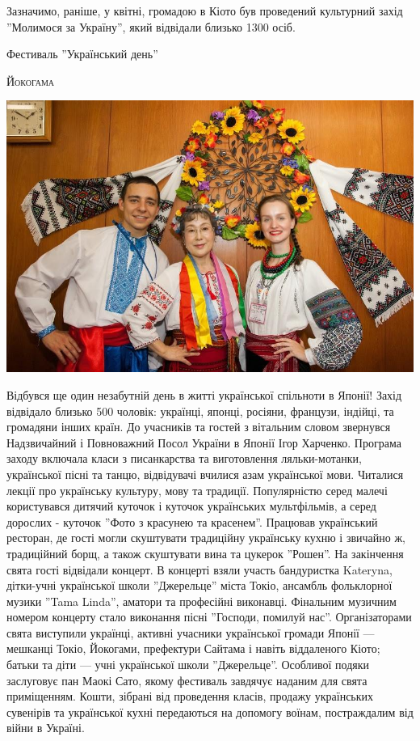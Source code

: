 \documentclass[10pt,a4paper]{article}
\newcommand{\NewsItem}[1]{%
		\usefont{T2A}{iwona}{m}{n} 
		\large #1 \vspace{4pt}
		\par \normalsize \normalfont}
\newcommand{\NewsAuthor}[1]{%
			\hfill \textsc{#1} \vspace{4pt}
			\par \normalfont}
\begin{document}
\begin{multicols}{3}
Зазначимо, раніше, у квітні, громадою в Кіото був проведений культурний захід ''Молимося за Україну'', який відвідали близько 1300 осіб.

\vspace{1cm}
\NewsItem{Фестиваль ''Український день''}
\NewsAuthor{Йокогама}
		\begin{center}
			\includegraphics[width=0.8\linewidth]{images/ukr-day-fest}
		\end{center}
Відбувся ще один незабутній день в житті української спільноти в Японії!
Захід відвідало близько 500 чоловік: українці, японці, росіяни, французи, індійці, та громадяни інших країн. До учасників та гостей з вітальним словом звернувся Надзвичайний і Повноважний Посол України в Японії Ігор Харченко.
Програма заходу включала класи з писанкарства та виготовлення ляльки-мотанки, української пісні та танцю, відвідувачі вчилися азам української мови. Читалися лекції про українську культуру, мову та традиції. Популярністю серед малечі користувався дитячий куточок і куточок українських мультфільмів, а серед дорослих - куточок ''Фото з красунею та красенем''.
Працював український ресторан, де гості могли скуштувати традиційну українську кухню і звичайно ж, традиційний борщ, а також скуштувати вина та цукерок ''Рошен''. 
На закінчення свята гості відвідали концерт.
В концерті взяли участь бандуристка Kateryna, дітки-учні української школи ''Джерельце'' міста Токіо, ансамбль фольклорної музики ''Tama Linda'', аматори та професійні виконавці. Фінальним музичним номером концерту стало виконання пісні ''Господи, помилуй нас''.
Організаторами свята виступили українці, активні учасники української громади Японії — мешканці Токіо, Йокогами, префектури Сайтама і навіть віддаленого Кіото; батьки та діти — учні української школи ''Джерельце''. Особливої подяки заслуговує пан Маокі Сато, якому фестиваль завдячує наданим для свята приміщенням.
Кошти, зібрані від проведення класів, продажу українських сувенірів та української кухні передаються на допомогу воїнам, постраждалим від війни в Україні.


\end{multicols}
\end{document}
